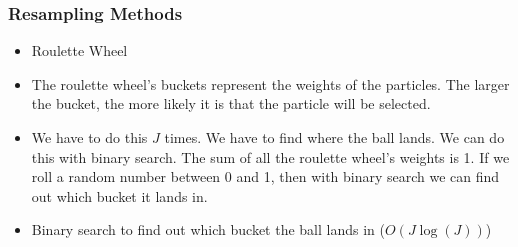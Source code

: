 \begin{frame}
    \frametitle{Resampling Methods}

    \scriptsize

    \begin{itemize}
        \item Roulette Wheel
        \item The roulette wheel's buckets represent the weights of the particles. The larger the bucket, the more likely it is that the particle will be selected.
        \item We have to do this $J$ times. We have to find where the ball lands. We can do this with binary search. The sum of all the roulette wheel's weights is 1. If we roll a random number between 0 and 1, then with binary search we can find out which bucket it lands in.
        \item Binary search to find out which bucket the ball lands in ($O(J \log(J))$)
    \end{itemize}
\end{frame}

